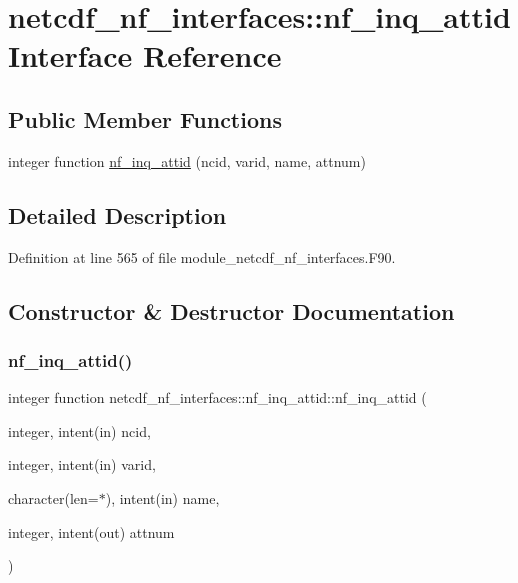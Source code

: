 \hypertarget{interfacenetcdf__nf__interfaces_1_1nf__inq__attid}{}\section{netcdf\+\_\+nf\+\_\+interfaces\+:\+:nf\+\_\+inq\+\_\+attid Interface Reference}
\label{interfacenetcdf__nf__interfaces_1_1nf__inq__attid}
\subsection*{Public Member Functions}
\begin{DoxyCompactItemize}
\item 
integer function \hyperlink{interfacenetcdf__nf__interfaces_1_1nf__inq__attid_af6ba2af3d9f0be37d2cfb23a420f9ecc}{nf\+\_\+inq\+\_\+attid} (ncid, varid, name, attnum)
\end{DoxyCompactItemize}


\subsection{Detailed Description}


Definition at line 565 of file module\+\_\+netcdf\+\_\+nf\+\_\+interfaces.\+F90.



\subsection{Constructor \& Destructor Documentation}
\mbox{\label{interfacenetcdf__nf__interfaces_1_1nf__inq__attid_af6ba2af3d9f0be37d2cfb23a420f9ecc}} 
\subsubsection{\texorpdfstring{nf\+\_\+inq\+\_\+attid()}{nf\_inq\_attid()}}
{\footnotesize\ttfamily integer function netcdf\+\_\+nf\+\_\+interfaces\+::nf\+\_\+inq\+\_\+attid\+::nf\+\_\+inq\+\_\+attid (\begin{DoxyParamCaption}\item[{integer, intent(in)}]{ncid,  }\item[{integer, intent(in)}]{varid,  }\item[{character(len=$\ast$), intent(in)}]{name,  }\item[{integer, intent(out)}]{attnum }\end{DoxyParamCaption})}




